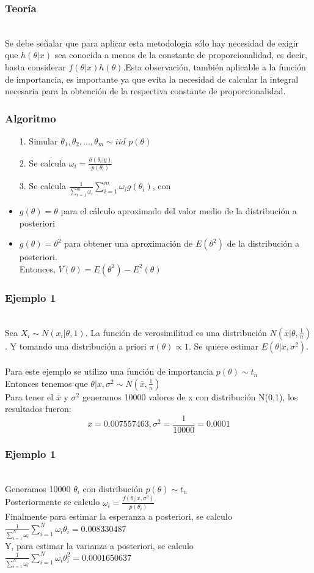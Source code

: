 \documentclass[12pt]{beamer}
\begin{document}
\begin{frame}
\frametitle{Teoría}
~\\ Se debe señalar que para aplicar esta metodologia sólo hay necesidad de exigir que $h(\theta|x)$ sea conocida a menos de la constante de proporcionalidad, es decir, basta considerar $f(\theta|x)h(\theta)$.Esta observación, también aplicable a la función de importancia, es importante ya que evita la necesidad de calcular la integral necesaria para la obtención de la respectiva constante de proporcionalidad.
\end{frame}

\begin{frame}
\frametitle{Algoritmo}
\begin{itemize}
\item[1.]Simular $\theta_{1},\theta_{2},...,\theta_{m}\sim iid$  $p(\theta)$
\item[2.]Se calcula $\omega_{i}=\frac{h(\theta_{i}|y)}{p(\theta_{i})}$
\item[3.]Se calcula $\frac{1}{\sum_{i=1}^{m}\omega_{i}}\sum_{i=1}^{m}\omega_{i}g(\theta_{i})$, con
\item $g(\theta)=\theta$ para el cálculo aproximado del valor medio de la distribución a posteriori
\item $g(\theta)=\theta^{2}$ para obtener una aproximación de $E(\theta^2)$ de la distribución a posteriori.
~\\Entonces, $V(\theta)=E(\theta^2)-E^2(\theta)$
\end{itemize}
\end{frame}

\begin{frame}
\frametitle{Ejemplo 1}
~\\Sea $X_{i}\sim N(x_{i}|\theta,1)$. La función de verosimilitud es una distribución $N(\bar{x}|\theta,\frac{1}{n})$. Y tomando una distribución a priori $\pi(\theta)\propto 1$. Se quiere estimar $E(\theta|x,\sigma^2)$.\\
~\\Para este ejemplo se utilizo una función de importancia $p(\theta)\sim t_{n}$
~\\Entonces tenemos que $\theta|x,\sigma^2\sim N(\bar{x},\frac{1}{n})$
~\\Para tener el $\bar{x}$ y $\sigma^2$ generamos 10000 valores de x con distribución N(0,1), los resultados fueron:
$$\bar{x}=0.007557463, \sigma^2=\frac{1}{10000}=0.0001$$
\end{frame}

\begin{frame}
\frametitle{Ejemplo 1}
~\\Generamos 10000 $\theta_{i}$ con distribución $p(\theta)\sim t_{n}$
~\\Posteriormente se calculo $\omega_{i}=\frac{f(\theta_{i}|x,\sigma^2)}{p(\theta_{i})}$
~\\Finalmente para estimar la esperanza a posteriori, se calculo $\frac{1}{\sum\limits_{i=1}^{N}\omega_{i}}\sum\limits_{i=1}^{N}\omega_{i}\theta_{i}=0.008330487$
~\\Y, para estimar la varianza a posteriori, se calculo $\frac{1}{\sum\limits_{i=1}^{N}\omega_{i}}\sum\limits_{i=1}^{N}\omega_{i}\theta_{i}^2=0.0001650637$
\end{frame}
\end{document}
